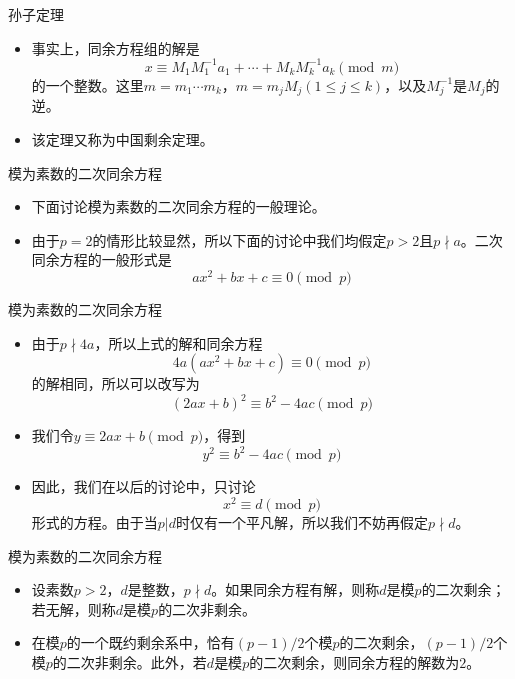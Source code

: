 \documentclass[dvipdfmx]{beamer}
\begin{document}
\begin{frame}{孙子定理}
\begin{itemize}
\item 事实上，同余方程组的解是
\begin{displaymath}
x\equiv M_1 M_1^{-1}a_1+\dotsb+M_k M_k^{-1}a_k\pmod{m}
\end{displaymath}
的一个整数。这里$m=m_1\dotsm m_k$，$m=m_jM_j(1\leq j\leq k)$，以及$M_j^{-1}$是$M_j$的逆。
\item 该定理又称为中国剩余定理。
\end{itemize}
\end{frame}

\begin{frame}{模为素数的二次同余方程}
\begin{itemize}
\item 下面讨论模为素数的二次同余方程的一般理论。
\item 由于$p = 2$的情形比较显然，所以下面的讨论中我们均假定$p > 2$且$p\nmid a$。二次同余方程的一般形式是
\begin{displaymath}
ax^2 + bx + c\equiv 0 \pmod{p}
\end{displaymath}
\end{itemize}
\end{frame}

\begin{frame}{模为素数的二次同余方程}
\begin{itemize}
\item 由于$p\nmid 4a$，所以上式的解和同余方程
\begin{displaymath}
4a(ax^2+bx+c)\equiv 0\pmod{p}
\end{displaymath}
的解相同，所以可以改写为
\begin{displaymath}
(2ax+b)^2\equiv b^2-4ac\pmod{p}
\end{displaymath}
\pause
\item 我们令$y\equiv 2ax+b\pmod{p}$，得到
\begin{displaymath}
y^2\equiv b^2-4ac\pmod{p}
\end{displaymath}
\item 因此，我们在以后的讨论中，只讨论
\begin{displaymath}
x^2\equiv d\pmod{p}
\end{displaymath}
形式的方程。由于当$p|d$时仅有一个平凡解，所以我们不妨再假定$p\nmid d$。
\end{itemize}
\end{frame}

\begin{frame}{模为素数的二次同余方程}
\begin{itemize}
\item 设素数$p>2$，$d$是整数，$p\nmid d$。如果同余方程有解，则称$d$是模$p$的二次剩余；若无解，则称$d$是模$p$的二次非剩余。
\item 在模$p$的一个既约剩余系中，恰有$(p-1)/2$个模$p$的二次剩余，$(p-1)/2$个模$p$的二次非剩余。此外，若$d$是模$p$的二次剩余，则同余方程的解数为$2$。
\end{itemize}
\end{frame}
\end{document}
